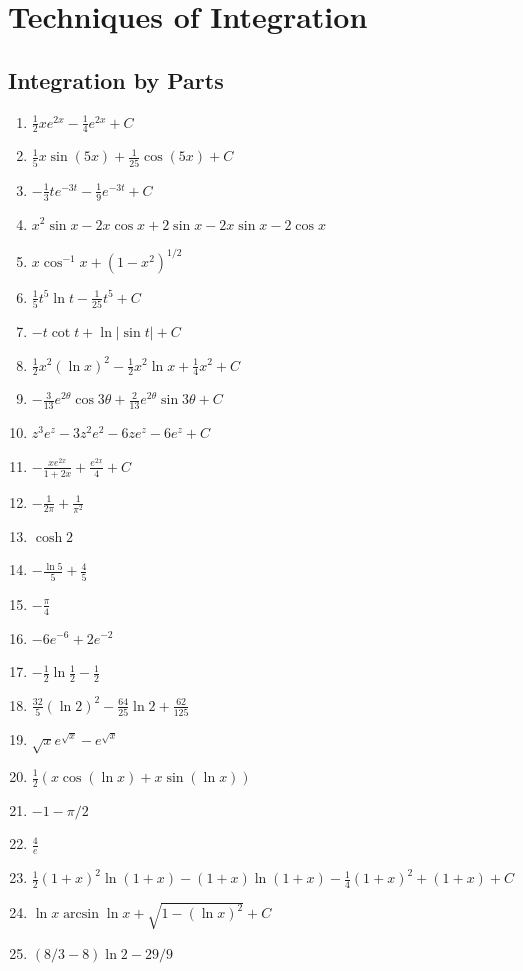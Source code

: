 \documentclass{article} \usepackage[margin=1in]{geometry}
\begin{document}
\section{Techniques of Integration}
\subsection{Integration by Parts}
\begin{enumerate}
	\item $\frac{1}{2}xe^{2x}-\frac{1}{4}e^{2x}+C$
	      \setcounter{enumi}{2}
	\item $\frac{1}{5}x\sin(5x)+\frac{1}{25}\cos(5x)+C$
	      \setcounter{enumi}{4}
	\item $-\frac{1}{3}te^{-3t}-\frac{1}{9}e^{-3t}+C$
	      \setcounter{enumi}{6}
	\item $x^2\sin{x}-2x\cos{x}+2\sin x-2x\sin x-2\cos x$
	      \setcounter{enumi}{8}
	\item $x\cos^{-1}x+(1-x^2)^{1/2}$
	      \setcounter{enumi}{10}
	\item $\frac{1}{5}t^5\ln{t}-\frac{1}{25}t^5+C$
	      \setcounter{enumi}{12}
	\item $-t\cot{t}+\ln|\sin t|+C$
	      \setcounter{enumi}{14}
	\item $\frac{1}{2}x^2(\ln x)^2-\frac{1}{2}x^2\ln x+\frac{1}{4}x^2+C$
	      \setcounter{enumi}{16}
	\item $-\frac{3}{13}e^{2\theta}\cos{3\theta}+\frac{2}{13}e^{2\theta}\sin{3\theta}+C$
	      \setcounter{enumi}{18}
	\item $z^3e^z-3z^2e^2-6ze^z-6e^z+C$
	      \setcounter{enumi}{20}
	\item $-\frac{xe^{2x}}{1+2x}+\frac{e^{2x}}{4}+C$
	      \setcounter{enumi}{22}
	\item $-\frac{1}{2\pi}+\frac{1}{\pi^2}$
	      \setcounter{enumi}{24}
	\item $\cosh2$
	      \setcounter{enumi}{26}
	\item $-\frac{\ln5}{5}+\frac{4}{5}$
	      \setcounter{enumi}{28}
	\item  $-\frac{\pi}{4}$
	      \setcounter{enumi}{30}
	\item $-6e^{-6}+2e^{-2}$
	      \setcounter{enumi}{32}
	\item $-\frac{1}{2}\ln\frac{1}{2}-\frac{1}{2}$
	      \setcounter{enumi}{34}
	\item $\frac{32}{5}(\ln2)^2-\frac{64}{25}\ln2+\frac{62}{125}$
	      \setcounter{enumi}{36}
	\item $\sqrt{x}e^{\sqrt{x}}-e^\sqrt{x}$
	\item $\frac{1}{2}(x\cos(\ln x)+x\sin(\ln x))$
	\item $-1-\pi/2$
	\item $\frac{4}{e}$
	\item $\frac{1}{2}(1+x)^2\ln(1+x)-(1+x)\ln(1+x)-\frac{1}{4}(1+x)^2+(1+x)+C$
	\item $\ln x\arcsin\ln x+\sqrt{1-(\ln x)^2}+C$
	      \setcounter{enumi}{56}
	\item $(8/3-8)\ln2-29/9$
\end{enumerate}
\end{document}
